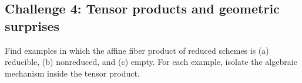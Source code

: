 \subsection*{Challenge 4: Tensor products and geometric surprises}
\begin{problem}\label{chal:vi23-04}
Find examples in which the affine fiber product of reduced schemes is (a) reducible, (b) nonreduced, and (c) empty. For each example, isolate the algebraic mechanism inside the tensor product.
\end{problem}
